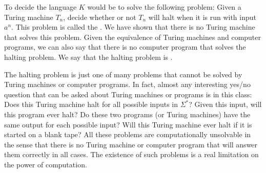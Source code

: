 \medbreak

To decide the language $K$ would be to solve the following
problem:  Given a Turing machine $T_n$, decide whether or
not $T_n$ will halt when it is run with input $a^n$.  This
problem is called the .  We have shown
that there is no Turing machine that solves this problem.
Given the equivalence of Turing machines and computer programs,
we can also say that there is no computer program that
solves the halting problem.  We say that the halting problem
is .

The halting problem is just one
of many problems that cannot be solved by Turing machines or
computer programs.  In fact, almost any interesting yes/no
question that can be asked about Turing machines or programs
is in this class:  Does this Turing machine halt for all possible
inputs in $\Sigma^*$?  Given this input, will this program
ever halt?  Do these two programs (or Turing machines) have
the same output for each possible input?  Will this Turing
machine ever halt if it is started on a blank tape?
All these problems are computationally unsolvable in the
sense that there is no Turing machine or computer program
that will answer them correctly in all cases. The
existence of such problems is a real limitation on the
power of computation.

